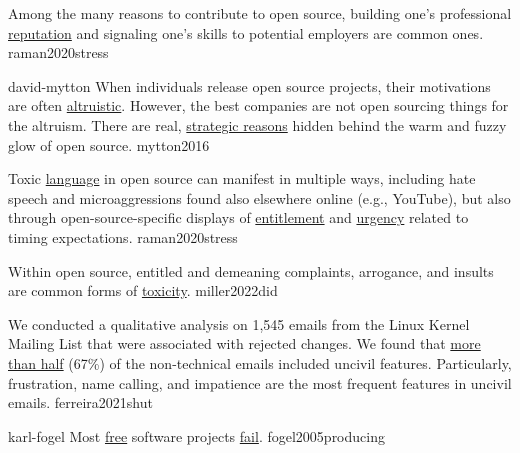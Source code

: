 \documentclass{article}
\begin{document}


  {Among the many reasons to contribute to open source, building one's professional \ul{reputation} and signaling one's skills to potential employers are common ones.}
  {raman2020stress}

\qte
  {david-mytton}
  {When individuals release open source projects, their motivations are often \ul{altruistic}. However, the best companies are not open sourcing things for the altruism. There are real, \ul{strategic reasons} hidden behind the warm and fuzzy glow of open source.}
  {mytton2016}


  {Toxic \ul{language} in open source can manifest in multiple ways, including hate speech and microaggressions found also elsewhere online (e.g., YouTube), but also through open-source-specific displays of \ul{entitlement} and \ul{urgency} related to timing expectations.}
  {raman2020stress}

  {Within open source, entitled and demeaning complaints, arrogance, and insults are common forms of \ul{toxicity}.}
  {miller2022did}

  {We conducted a qualitative analysis on 1,545 emails from the Linux Kernel Mailing List that were associated with rejected changes. We found that \ul{more than half} (67\%) of the non-technical emails included uncivil features. Particularly, frustration, name calling, and impatience are the most frequent features in uncivil emails. }
  {ferreira2021shut}


\qte
  {karl-fogel}
  {Most \ul{free} software projects \ul{fail}.}
  {fogel2005producing}
\end{document}
